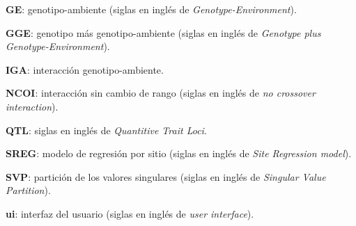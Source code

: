 \begin{spacing}{1}
\begin{description}
\item{\textbf{GE}}: genotipo-ambiente (siglas en inglés de \emph{Genotype-Environment}).

\item{\textbf{GGE}}: genotipo más genotipo-ambiente (siglas en inglés de \emph{Genotype plus Genotype-Environment}).

\item{\textbf{IGA}}: interacción genotipo-ambiente.

\item{\textbf{NCOI}}: interacción sin cambio de rango (siglas en inglés de \emph{no crossover interaction}).

\item{\textbf{QTL}}: siglas en inglés de \emph{Quantitive Trait Loci}.

\item{\textbf{SREG}}: modelo de regresión por sitio (siglas en inglés de \emph{Site Regression model}).

\item{\textbf{SVP}}: partición de los valores singulares (siglas en inglés de \emph{Singular Value Partition}).

\item{\textbf{ui}}: interfaz del usuario (siglas en inglés de \emph{user interface}).


\end{description}
\end{spacing}